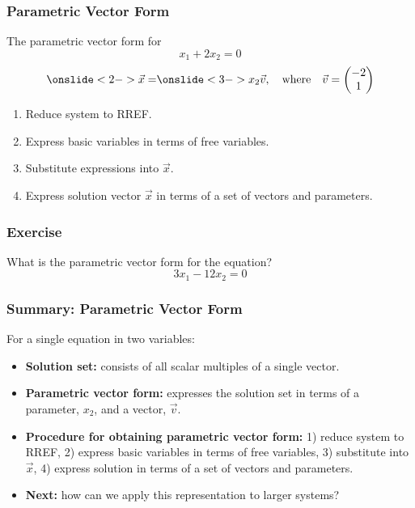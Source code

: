 \begin{frame}
\frametitle{Parametric Vector Form}
The parametric vector form for
$$x_1 + 2x_2 = 0$$
\begin{align*}
    \onslide<2->{
    \vec{x} = }\onslide<3->{x_2 \vec v, \quad \text{where} \quad \vec v = \begin{pmatrix} -2 \\ 1 \end{pmatrix}}
\end{align*}



\begin{enumerate}
    \item<6-> Reduce system to RREF.
    \item<7-> Express basic variables in terms of free variables.
    \item<8-> Substitute expressions into $\vec x$.
    \item<9-> Express solution vector $\vec x$ in terms of a set of vectors and parameters.
\end{enumerate}

\end{frame}

\begin{frame}
\frametitle{Exercise}
What is the parametric vector form for the equation? 
$$3x_1 - 12x_2 = 0$$

\end{frame}

\begin{frame}
\frametitle{Summary: Parametric Vector Form}
For a single equation in two variables:
\begin{itemize}
    \item<2-> \textbf{Solution set:} consists of all scalar multiples of a single vector.
    \item<3-> \textbf{Parametric vector form: } expresses the solution set in terms of a parameter, $x_2$, and a vector, $\vec v$.
    \item<4-> \textbf{Procedure for obtaining parametric vector form: } 1) reduce system to RREF, 2) express basic variables in terms of free variables, 3) substitute into $\vec x$, 4) express solution in terms of a set of vectors and parameters.
    \item<5-> \textbf{Next: }how can we apply this representation to larger systems?  
\end{itemize}

\end{frame}

